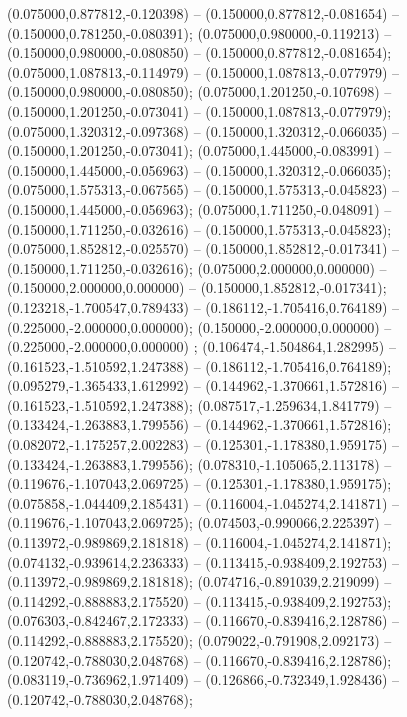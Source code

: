  (0.075000,0.877812,-0.120398) -- (0.150000,0.877812,-0.081654) -- (0.150000,0.781250,-0.080391);
 (0.075000,0.980000,-0.119213) -- (0.150000,0.980000,-0.080850) -- (0.150000,0.877812,-0.081654);
 (0.075000,1.087813,-0.114979) -- (0.150000,1.087813,-0.077979) -- (0.150000,0.980000,-0.080850);
 (0.075000,1.201250,-0.107698) -- (0.150000,1.201250,-0.073041) -- (0.150000,1.087813,-0.077979);
 (0.075000,1.320312,-0.097368) -- (0.150000,1.320312,-0.066035) -- (0.150000,1.201250,-0.073041);
 (0.075000,1.445000,-0.083991) -- (0.150000,1.445000,-0.056963) -- (0.150000,1.320312,-0.066035);
 (0.075000,1.575313,-0.067565) -- (0.150000,1.575313,-0.045823) -- (0.150000,1.445000,-0.056963);
 (0.075000,1.711250,-0.048091) -- (0.150000,1.711250,-0.032616) -- (0.150000,1.575313,-0.045823);
 (0.075000,1.852812,-0.025570) -- (0.150000,1.852812,-0.017341) -- (0.150000,1.711250,-0.032616);
 (0.075000,2.000000,0.000000) -- (0.150000,2.000000,0.000000) -- (0.150000,1.852812,-0.017341);
 (0.123218,-1.700547,0.789433) -- (0.186112,-1.705416,0.764189) -- (0.225000,-2.000000,0.000000);
 (0.150000,-2.000000,0.000000) -- (0.225000,-2.000000,0.000000) ;
 (0.106474,-1.504864,1.282995) -- (0.161523,-1.510592,1.247388) -- (0.186112,-1.705416,0.764189);
 (0.095279,-1.365433,1.612992) -- (0.144962,-1.370661,1.572816) -- (0.161523,-1.510592,1.247388);
 (0.087517,-1.259634,1.841779) -- (0.133424,-1.263883,1.799556) -- (0.144962,-1.370661,1.572816);
 (0.082072,-1.175257,2.002283) -- (0.125301,-1.178380,1.959175) -- (0.133424,-1.263883,1.799556);
 (0.078310,-1.105065,2.113178) -- (0.119676,-1.107043,2.069725) -- (0.125301,-1.178380,1.959175);
 (0.075858,-1.044409,2.185431) -- (0.116004,-1.045274,2.141871) -- (0.119676,-1.107043,2.069725);
 (0.074503,-0.990066,2.225397) -- (0.113972,-0.989869,2.181818) -- (0.116004,-1.045274,2.141871);
 (0.074132,-0.939614,2.236333) -- (0.113415,-0.938409,2.192753) -- (0.113972,-0.989869,2.181818);
 (0.074716,-0.891039,2.219099) -- (0.114292,-0.888883,2.175520) -- (0.113415,-0.938409,2.192753);
 (0.076303,-0.842467,2.172333) -- (0.116670,-0.839416,2.128786) -- (0.114292,-0.888883,2.175520);
 (0.079022,-0.791908,2.092173) -- (0.120742,-0.788030,2.048768) -- (0.116670,-0.839416,2.128786);
 (0.083119,-0.736962,1.971409) -- (0.126866,-0.732349,1.928436) -- (0.120742,-0.788030,2.048768);
